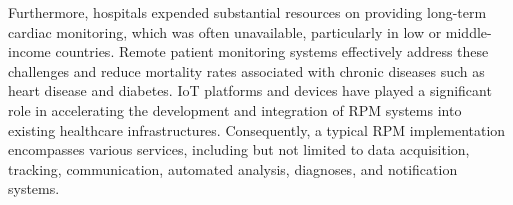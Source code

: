 Furthermore, hospitals expended substantial resources on providing long-term cardiac monitoring, which was often unavailable, particularly in low or middle-income countries. 
Remote patient monitoring systems effectively address these challenges and reduce mortality rates associated with chronic diseases such as heart disease and diabetes. IoT platforms and devices have played a significant role in accelerating the development and integration of RPM systems into existing healthcare infrastructures. Consequently, a typical RPM implementation encompasses various services, including but not limited to data acquisition, tracking, communication, automated analysis, diagnoses, and notification systems.


